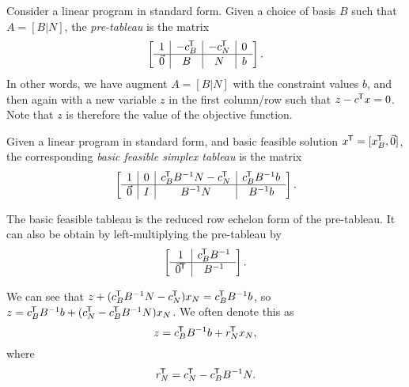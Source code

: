\begin{defn}
    Consider a linear program in standard form. Given a choice of basis $B$ such that $A = [B | N]$, the \emph{pre-tableau} is the matrix
    \begin{align*}
        \left[\begin{array}{c|c|c|c}
            1 & -c_B^{\mkern-1.5mu\mathsf{T}} & -c_N^{\mkern-1.5mu\mathsf{T}} & 0 \\
            \hline
            \vec{0} & B & N & b
        \end{array}\right].
    \end{align*}
    In other words, we have augment $A = [B|N]$ with the constraint values $b$, and then again with a new variable $z$ in the first column/row such that $z - c^{\mkern-1.5mu\mathsf{T}}x = 0$. Note that $z$ is therefore the value of the objective function.
\end{defn}

\begin{defn}
    Given a linear program in standard form, and basic feasible solution $x^{\mkern-1.5mu\mathsf{T}} = [x_B^{\mkern-1.5mu\mathsf{T}}, \vec{0}]$, the corresponding \emph{basic feasible simplex tableau} is the matrix
    \begin{align*}
        \left[\begin{array}{c|c|c|c}
            1 & 0 & c_B^{\mkern-1.5mu\mathsf{T}}B^{-1}N-c_N^{\mkern-1.5mu\mathsf{T}} & c_B^{\mkern-1.5mu\mathsf{T}}B^{-1}b \\
            \hline
            \vec{0} & I & B^{-1}N & B^{-1}b
        \end{array}\right].
    \end{align*}
\end{defn}

\begin{rmk}
    The basic feasible tableau is the reduced row echelon form of the pre-tableau. It can also be obtain by left-multiplying the pre-tableau by
    \begin{align*}
        \left[\begin{array}{c|c}
            1 & c_B^{\mkern-1.5mu\mathsf{T}}B^{-1} \\
            \hline
            \vec{0}^{\mkern-1.5mu\mathsf{T}} & B^{-1}
        \end{array}\right].
    \end{align*}
\end{rmk}

\begin{rmk}
    We can see that $z + (c_B^{\mkern-1.5mu\mathsf{T}}B^{-1}N-c_N^{\mkern-1.5mu\mathsf{T}})x_N = c_B^{\mkern-1.5mu\mathsf{T}}B^{-1}b$, so $z = c_B^{\mkern-1.5mu\mathsf{T}}B^{-1}b + (c_N^{\mkern-1.5mu\mathsf{T}} - c_B^{\mkern-1.5mu\mathsf{T}}B^{-1}N)x_N$. We often denote this as
    \[z = c_B^{\mkern-1.5mu\mathsf{T}}B^{-1}b + r_N^{\mkern-1.5mu\mathsf{T}}x_N,\]
    where
    \[r_N^{\mkern-1.5mu\mathsf{T}} = c_N^{\mkern-1.5mu\mathsf{T}} - c_B^{\mkern-1.5mu\mathsf{T}}B^{-1}N.\]
\end{rmk}

